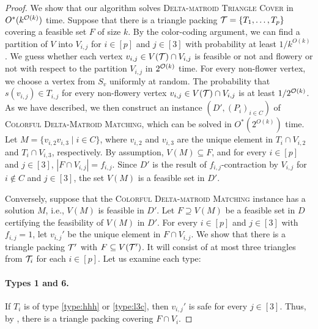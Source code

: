 \dmtc*
\begin{proof}
  We show that our algorithm solves \textsc{Delta-matroid Triangle Cover} in $O^*(k^{\mathcal{O}(k)})$ time.
  Suppose that there is a triangle packing $\mathcal T = \{ T_1, \dots, T_p \}$ covering a feasible set $F$ of size $k$.
  By the color-coding argument, we can find a partition of $V$ into $V_{i,j}$ for $i \in [p]$ and $j \in [3]$ with probability at least $1 / k^{O(k)}$.
  We guess whether each vertex $v_{i,j} \in V(\mathcal T) \cap V_{i,j}$ is feasible or not and flowery or not with respect to the partition $V_{i,j}$ in $2^{\mathcal{O}(k)}$ time.
  For every non-flower vertex, we choose a vertex from $S_v$ uniformly at random.
  The probability that $s(v_{i,j}) \in T_{i,j}$ for every non-flowery vertex $v_{i,j} \in V(\mathcal T) \cap V_{i,j}$ is at least $1/2^{\mathcal{O}(k)}$.
  As we have described, we then construct an instance $(D', (P_i)_{i \in C})$ of \textsc{Colorful Delta-Matroid Matching}, which can be solved in $O^*(2^{O(k)})$ time.
  Let $M = \{ v_{i,2} v_{i,3} \mid i \in C \}$, where $v_{i,2}$ and $v_{i,3}$ are the unique element in $T_i \cap V_{i,2}$ and $T_i \cap V_{i,3}$, respectively.
  By assumption, $V(M) \subseteq F$, and for every $i \in [p]$ and $j \in [3]$, $|F \cap V_{i,j}| = f_{i,j}$.
  Since $D'$ is the result of $f_{i,j}$-contraction by $V_{i,j}$ for $i \notin C$ and $j \in [3]$, 
  the set $V(M)$ is a feasible set in $D'$.
  

  Conversely, suppose that the \textsc{Colorful Delta-matroid Matching} instance has a solution $M$, i.e., $V(M)$ is feasible in $D'$.
  Let $F \supseteq V(M)$ be a feasible set in $D$ certifying the feasibility of $V(M)$ in $D'$.
  For every $i \in [p]$ and $j \in [3]$ with $f_{i,j} = 1$, let $v_{i,j}'$ be the unique element in $F \cap V_{i,j}$.
  We show that there is a triangle packing $\mathcal T'$ with $F \subseteq V(\mathcal T')$.
  It will consist of at most three triangles from $\mathcal T_i$ for each $i \in [p]$.
  Let us examine each type:
  \paragraph*{Types 1 and 6.}
    If $T_i$ is of type \ref{type:hhh} or \ref{type:l3c}, then $v_{i,j}'$ is safe for every $j \in [3]$.
    Thus, by , there is a triangle packing covering $F \cap V_i$.

\end{proof}
